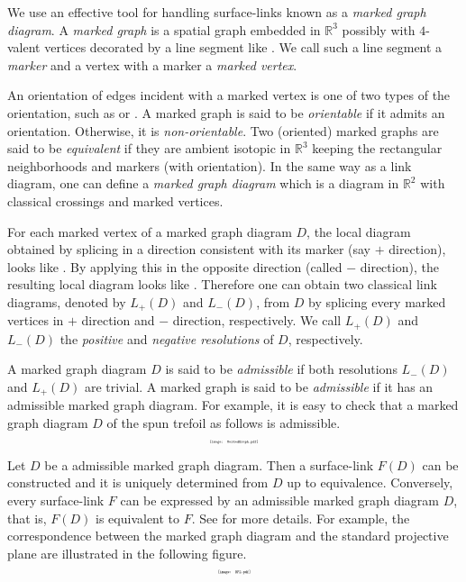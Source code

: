 \documentclass{article}
\theoremstyle{definition}
\begin{document}
We use an effective tool for handling surface-links known as a \textit{marked 
graph diagram}. A \textit{marked graph} is a spatial graph embedded in 
$\mathbb{R}^3$ possibly with $4$-valent vertices decorated by a line segment 
like .
We call such a line segment a \textit{marker} and a vertex with a marker a 
\textit{marked vertex}.

An orientation of edges incident with a marked vertex is one of two types of 
the orientation, such as  
or .
A marked graph is said to be \textit{orientable} if it admits an orientation.
Otherwise, it is \textit{non-orientable}. 
Two (oriented) marked graphs are said to be \textit{equivalent} if they are 
ambient isotopic in $\mathbb{R}^3$ keeping the rectangular neighborhoods 
and markers (with orientation).
In the same way as a link diagram, one can define a \textit{marked graph 
diagram} which is a diagram in $\mathbb{R}^2$ with classical crossings and 
marked vertices.


For each marked vertex  of 
a marked graph diagram $D$, the local diagram obtained by splicing in a 
direction consistent with its marker (say $+$ direction), looks like 
. 
By applying this in the opposite direction (called $-$ direction), the resulting local diagram looks like . 
Therefore one can obtain two classical link diagrams, denoted by $L_{+}(D)$ and $L_{-}(D)$, from $D$ by splicing every marked vertices in $+$ direction and $-$ direction, respectively. 
We call $L_{+}(D)$ and $L_{-}(D)$ the \textit{positive} and \textit{negative resolutions} of $D$, respectively. 


A marked graph diagram $D$ is said to be \textit{admissible} if both resolutions $L_{-}(D)$ and $L_{+}(D)$ are trivial. A marked graph is said to be \textit{admissible} if it has an admissible marked graph diagram.
For example, it is easy to check that a marked graph diagram $D$ of the spun trefoil as follows is admissible.
\[\scalebox{0.3}{\texttt{[image: MarkedGraph.pdf]}}\]

Let $D$ be a admissible marked graph diagram. Then
a surface-link $F(D)$ can be constructed and it is uniquely determined from $D$ 
up to equivalence. %
Conversely, every surface-link $F$ can be expressed by an admissible marked graph diagram $D$, that is, $F(D)$ is equivalent to $F$.
See \cite{KawauchiShibuyaSuzuki,Lomonaco,Yoshikawa} for more details. 
For example, the correspondence between the marked graph diagram and the standard projective plane are illustrated in the following figure.
\[\scalebox{0.3}{\texttt{[image: RP2.pdf]}}\]
\end{document}
